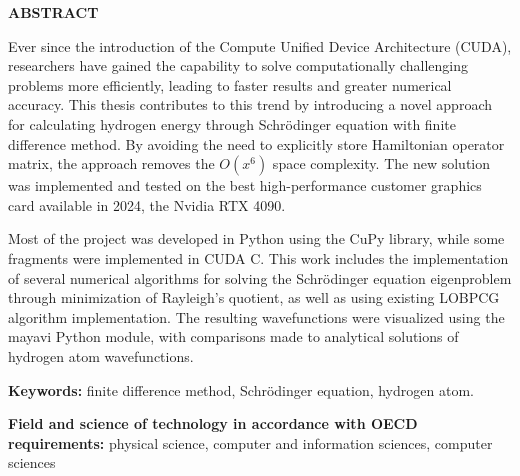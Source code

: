 \noindent
\begingroup
\fontsize{12pt}{1.5pt}\selectfont
\textbf{ABSTRACT}
\endgroup

\vspace{3mm}

Ever since the introduction of the Compute Unified Device Architecture (CUDA), researchers have gained the capability to solve computationally challenging problems more efficiently, leading to faster results and greater numerical accuracy. This thesis contributes to this trend by introducing a novel approach for calculating hydrogen energy through Schr{\"o}dinger equation with finite difference method. By avoiding the need to explicitly store Hamiltonian operator matrix, the approach removes the $O(x^6)$ space complexity. The new solution was implemented and tested on the best high-performance customer graphics card available in 2024, the Nvidia RTX 4090.

Most of the project was developed in Python using the CuPy library, while some fragments were implemented in CUDA C. This work includes the implementation of several numerical algorithms for solving the Schrödinger equation eigenproblem through minimization of Rayleigh's quotient, as well as using existing LOBPCG algorithm implementation. The resulting wavefunctions were visualized using the mayavi Python module, with comparisons made to analytical solutions of hydrogen atom wavefunctions.

\textbf{Keywords:} finite difference method, Schrödinger equation, hydrogen atom.

\textbf{Field and science of technology in accordance with OECD requirements:}
physical science, computer and information sciences, computer sciences

